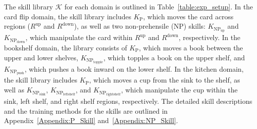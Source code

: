 The skill library $\mathcal{K}$ for each domain is outlined in Table~\ref{table:exp_setup}. In the card flip domain, the skill library includes \(K_\text{P}\), which moves the card across regions (\(R^\text{up}\) and \(R^\text{down}\)), as well as two non-prehensile (NP) skills: \(K_{\text{NP}_\text{up}}\) and \(K_{\text{NP}_\text{down}}\), which manipulate the card within \(R^\text{up}\) and \(R^\text{down}\), respectively. In the bookshelf domain, the library consists of \(K_\text{P}\), which moves a book between the upper and lower shelves, \(K_{\text{NP}_\text{topple}}\), which topples a book on the upper shelf, and \(K_{\text{NP}_\text{push}}\), which pushes a book inward on the lower shelf. In the kitchen domain, the skill library includes \(K_\text{P}\), which moves a cup from the sink to the shelf, as well as \(K_{\text{NP}_\text{sink}}\), \(K_{\text{NP}_\text{leftshelf}}\), and \(K_{\text{NP}_\text{rightshelf}}\), which manipulate the cup within the sink, left shelf, and right shelf regions, respectively. The detailed skill descriptions and the training methods for the skills are outlined in Appendix~\ref{Appendix:P_Skill} and~\ref{Appendix:NP_Skill}.


    


